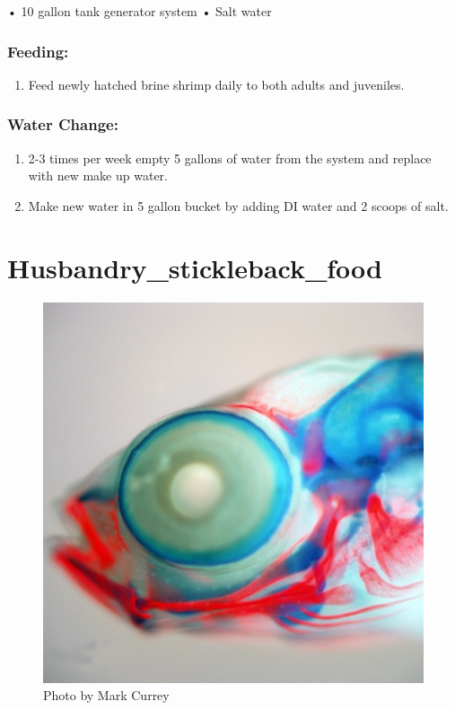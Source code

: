 \documentclass[
]{book}
\providecommand{\tightlist}{%
  \setlength{\itemsep}{0pt}\setlength{\parskip}{0pt}}
\begin{document}
• 10 gallon tank generator system
• Salt water

\hypertarget{feeding-1}{%
\subsection{Feeding:}\label{feeding-1}}

\begin{enumerate}
\def\labelenumi{\arabic{enumi}.}
\tightlist
\item
  Feed newly hatched brine shrimp daily to both adults and juveniles.
\end{enumerate}

\hypertarget{water-change}{%
\subsection{Water Change:}\label{water-change}}

\begin{enumerate}
\def\labelenumi{\arabic{enumi}.}
\tightlist
\item
  2-3 times per week empty 5 gallons of water from the system and replace with new make up water.
\item
  Make new water in 5 gallon bucket by adding DI water and 2 scoops of salt.
\end{enumerate}

\hypertarget{husbandry_stickleback_food-1}{%
\chapter{Husbandry\_stickleback\_food}\label{husbandry_stickleback_food-1}}

\begin{figure}
\centering
\includegraphics{images/double_head.jpg}
\caption{Photo by Mark Currey}
\end{figure}
\end{document}
